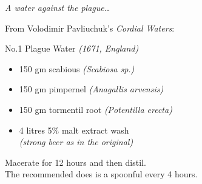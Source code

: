 \documentclass[11pt]{report}
\begin{document}
    \begin{titlepage}
    

        \begin{multicols}{3}
            \raggedcolumns

            {
                \emph{A water against the plague\ldots}
            }

            \columnbreak

            {
                From Volodimir Pavliuchuk's \emph{Cordial Waters}:\\
            }

            \vspace*{2\baselineskip}

            {
                No.1 Plague Water \emph{(1671, England)}
                \vspace*{\baselineskip}
                \begin{itemize}
                    \renewcommand{\labelitemi}{$\circ$}
                    \item 150 gm scabious \emph{(Scabiosa sp.)}
                    \item 150 gm pimpernel \emph{(Anagallis arvensis)}
                    \item 150 gm tormentil root \emph{(Potentilla erecta)}
                    \item 4 litres 5\% malt extract wash\\
                        [0.4\baselineskip]
                        \emph{(strong beer as in the original)}
                \end{itemize}
                \vspace*{\baselineskip}
                Macerate for 12 hours and then distil.\\
                The recommended does is a spoonful every 4 hours.
            }

            \columnbreak
            \vspace*{3.2\baselineskip}


\end{multicols}
\end{titlepage}
\end{document}
